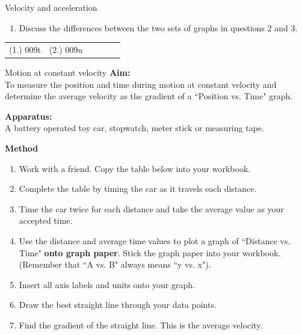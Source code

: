 \begin{exercises}{Velocity and acceleration }
\begin{enumerate}[noitemsep, label=\textbf{\arabic*}. ]
\begin{enumerate}[noitemsep, label=\textbf{\alph*}. ]
\label{m38795*uid100}\item Discuss the differences between the two sets of graphs in questions 2 and 3.\end{enumerate}
        \end{enumerate}
\label{m38795*secfhsst!!!underscore!!!id2603}
\par \practiceinfo
 \par \begin{tabular}[h]{cccccc}
 (1.) 009t  &  (2.) 009u  & \end{tabular}
\end{exercises}
\begin{g_experiment}{Motion at constant velocity }
            \nopagebreak
\textbf{Aim:}\\
To measure the position and time during motion at constant velocity and determine the average velocity as the gradient of a ``Position vs. Time" graph.\par 
        \label{m38795*id71286}\noindent{}\textbf{Apparatus:}\\
 A battery operated toy car, stopwatch, meter stick or measuring tape.\par 
        \label{m38795*id71301}\noindent{}\textbf{Method}\\
        \label{m38795*id71310}\begin{enumerate}[noitemsep, label=\textbf{\arabic*}. ] 
            \label{m38795*uid101}\item Work with a friend. Copy the table below into your workbook.
\label{m38795*uid102}\item Complete the table by timing the car as it travels each distance.
\label{m38795*uid103}\item Time the car twice for each distance and take the average value as your accepted time.
\label{m38795*uid104}\item Use the distance and average time values to plot a graph of ``Distance vs. Time" \textbf{onto graph paper}. Stick the graph paper into your workbook. (Remember that ``A vs. B" always means ``y vs. x").
\label{m38795*uid105}\item Insert all axis labels and units onto your graph.
\label{m38795*uid106}\item Draw the best straight line through your data points.
\label{m38795*uid107}\item Find the gradient of the straight line. This is the average velocity.
\end{enumerate}
        \par 

\end{g_experiment}
